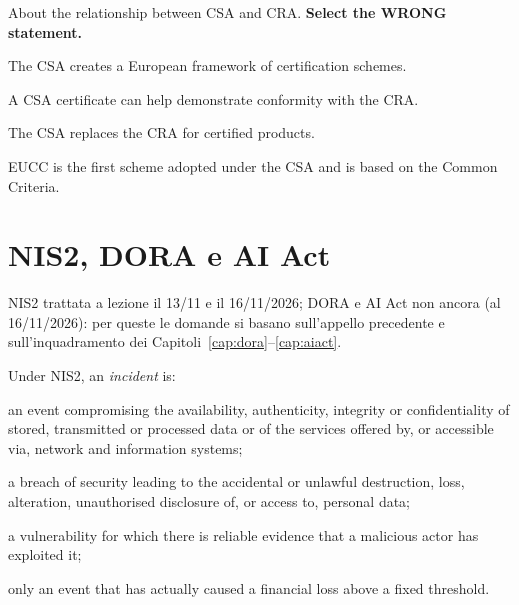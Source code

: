 \begin{domanda}\label{q:csa-cra}
About the relationship between CSA and CRA. \textbf{Select the WRONG statement.}
\begin{opzioni}
  \item The CSA creates a European framework of certification schemes.
  \item A CSA certificate can help demonstrate conformity with the CRA.
  \item The CSA replaces the CRA for certified products.
  \item EUCC is the first scheme adopted under the CSA and is based on the Common Criteria.
\end{opzioni}
\end{domanda}

\section{NIS2, DORA e AI Act}

\begin{nota}
NIS2 trattata a lezione il 13/11 e il 16/11/2026; DORA e AI Act non ancora (al 16/11/2026): per queste le domande
si basano sull'appello precedente e sull'inquadramento dei Capitoli~\ref{cap:dora}--\ref{cap:aiact}.
\end{nota}

\begin{domanda}\label{q:nis2-incidente}
Under NIS2, an \emph{incident} is:
\begin{opzioni}
  \item an event compromising the availability, authenticity, integrity or confidentiality of stored,
    transmitted or processed data or of the services offered by, or accessible via, network and
    information systems;
  \item a breach of security leading to the accidental or unlawful destruction, loss, alteration,
    unauthorised disclosure of, or access to, personal data;
  \item a vulnerability for which there is reliable evidence that a malicious actor has exploited it;
  \item only an event that has actually caused a financial loss above a fixed threshold.
\end{opzioni}
\end{domanda}

